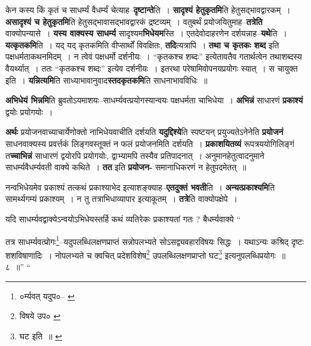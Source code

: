 \documentclass[article,12pt,a4paper]{memoir}
\begin{document}
	  \endgroup
	

	  \pstart केन कस्य किं कृतं च साधर्म्यं वैधर्म्यं चेत्याह--\textbf{दृष्टान्ते}ति । \textbf{सादृश्यं हेतुकृतमि}ति हेतुसद्भावद्वारकम् । \textbf{असादृश्यं च हेतुकृतमि}ति हेतुसद्भावासद्भावद्वारकं द्रष्टव्यम् । वतुबर्थं प्रयोजयितुमाह--\textbf{तत्रेति} वाक्योपन्यासे । \textbf{यस्य वाक्यस्य साधर्म्य} सादृश्यम\textbf{भिधेयम}स्ति । एतदेवोदाहरणेन दर्शयन्नाह--\textbf{यथे}ति । \textbf{यत्कृतकमि}ति । यद् यद् कृतकमिति वीप्सार्थों विवक्षितः, \textbf{तदि}त्यत्रापि । \textbf{तथा च कृतकः शब्द} इति पक्षधर्मताकथनमिदम् । न त्वेवं पक्षधर्मो दर्शनीयः । “कृतकश्च शब्दः” इत्येतावतैव गतार्थत्वेन तथाशब्दस्य वैयर्थ्यात् । ततः “कृतकश्च शब्दः” इत्येव दर्शनीयः । इतरथा परेषामिवोपनयप्रयोगः स्यात् । स चायुक्त इति । \textbf{यन्नित्यमि}ति साध्याभावानुवाद\textbf{स्तदकृतकमि}ति साधनाभावविधिः ॥
	\pend
      

	  \pstart \textbf{अभिधेयं भिन्नमि}ति ब्रुवतोऽयमाशयः--साधर्म्यवत्प्रयोगस्यान्वयः पक्षधर्मता चाभिधेया । \textbf{अभिन्नं} साधारणं \textbf{प्रकाश्यं} द्वयोः प्रयोगयोः ।
	\pend
      

	  \pstart \textbf{अर्थः} प्रयोजनवाच्याचार्येणोक्तो नाभिधेयवाचीति दर्शयति \textbf{यदुद्दिश्ये}ति स्पष्टयन् प्रयुज्यतेऽनेनेति \textbf{प्रयोजनं} साधनवाक्यस्य प्रवर्त्तकं लिङ्गवस्तूक्तं न फलं प्रयोजनमिति दर्शयति । \textbf{प्रकाशयितव्यं} रूपत्रययोगिलिङ्गं त\textbf{च्चाभिन्नं} साधारणं द्वयोरपि प्रयोगयोः, द्वाभ्यामपि तस्यैव प्रतिपादनात् । अनुमानहेतुत्वादनुमाने साधर्म्यवैधर्म्यवती वाक्ये कथिते । \textbf{तत} इति \textbf{प्रयोजन-} समानाधिकरणं न हेतुपदमेतत् ॥
	\pend
      

	  \pstart नन्वभिधेयमेव प्रकाश्यं तत्कथं प्रकाश्याभेद इत्याशङ्क्याह--\textbf{एतदुक्तं भवती}ति । \textbf{अन्यत्प्रकाश्यमि}ति सामर्थ्यगम्यं प्रकाश्यम् । न तु तत्राभिधाव्यापार इत्याकूतम् । \textbf{तत्रे}ति वाक्योपक्षेपे ।
	\pend
      

	  \pstart यदि साधर्म्यवद्वाक्येऽन्वयोऽभिधेयस्तर्हि कथं व्यतिरेकः प्रकाश्यतां गतः ? बैधर्म्यवाक्ये  \leavevmode{} “
	  
	तत्र साधर्म्यवत्प्रोगः\footnote{०र्म्यवत् यदुप०--\cite{dp-msD} \cite{dp-msB} \cite{dp-edP} \cite{dp-edH} \cite{dp-edE} \cite{dp-edN}}\---यदुपलब्धिलक्षणप्राप्तं सन्नोपलभ्यते सोऽसद्व्यवहारविषयः सिद्धः । यथाऽन्यः कश्रिद् दृष्टः शशविषाणादिः । नोपलभ्यते च क्वचित् प्रदेशविशेष\footnote{विषये उप० \cite{dp-msC}} उपलब्धिलक्षणप्राप्तो घट\footnote{घट इति ॥ \cite{dp-msD} \cite{dp-msB} \cite{dp-edP} \cite{dp-edH} \cite{dp-edE} \cite{dp-edN}} इत्यनुपलब्धिप्रयोगः ॥ ८ ॥” “
	  
\end{document}
